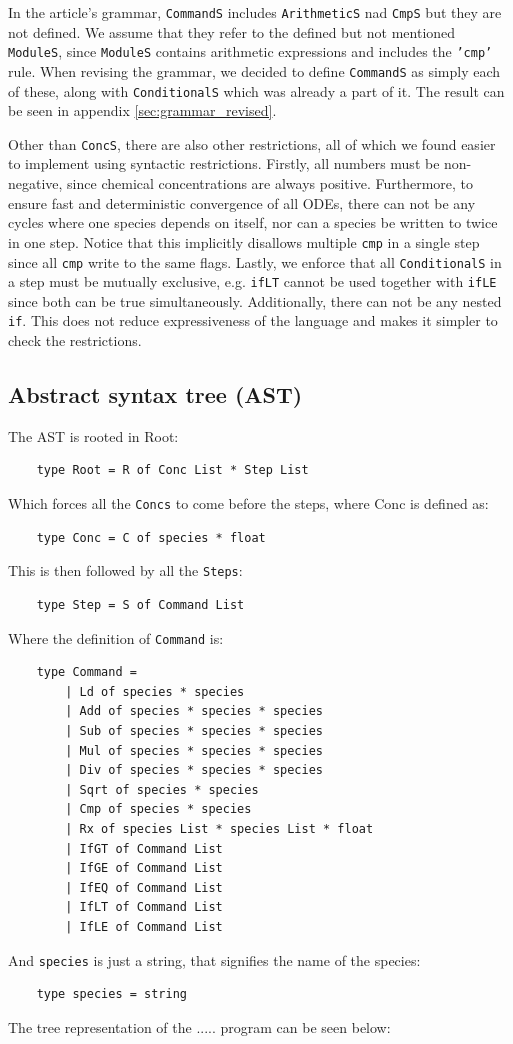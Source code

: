 In the article's grammar, \texttt{CommandS} includes \texttt{ArithmeticS} nad \texttt{CmpS} but they are not defined. We assume that they refer to the defined but not mentioned \texttt{ModuleS}, since \texttt{ModuleS} contains arithmetic expressions and includes the \texttt{'cmp'} rule. When revising the grammar, we decided to define \texttt{CommandS} as simply each of these, along with \texttt{ConditionalS} which was already a part of it. The result can be seen in appendix \ref{sec:grammar_revised}. 

Other than \texttt{ConcS}, there are also other restrictions, all of which we found easier to implement using syntactic restrictions. Firstly, all numbers must be non-negative, since chemical concentrations are always positive. Furthermore, to ensure fast and deterministic convergence of all ODEs, there can not be any cycles where one species depends on itself, nor can a species be written to twice in one step. Notice that this implicitly disallows multiple \texttt{cmp} in a single step since all \texttt{cmp} write to the same flags. Lastly, we enforce that all \texttt{ConditionalS} in a step must be mutually exclusive, e.g. \texttt{ifLT} cannot be used together with \texttt{ifLE} since both can be true simultaneously. Additionally, there can not be any nested \texttt{if}. This does not reduce expressiveness of the language and makes it simpler to check the restrictions.


\subsection{Abstract syntax tree (AST)}

The AST is rooted in Root: 
\begin{verbatim}
    type Root = R of Conc List * Step List
\end{verbatim}
Which forces all the \texttt{Concs} to come before the steps, where Conc is defined as:
\begin{verbatim}
    type Conc = C of species * float
\end{verbatim}
This is then followed by all the \texttt{Steps}:
\begin{verbatim}
    type Step = S of Command List
\end{verbatim}
Where the definition of \texttt{Command} is:
\begin{verbatim}
    type Command =
        | Ld of species * species
        | Add of species * species * species
        | Sub of species * species * species
        | Mul of species * species * species
        | Div of species * species * species
        | Sqrt of species * species
        | Cmp of species * species
        | Rx of species List * species List * float
        | IfGT of Command List
        | IfGE of Command List
        | IfEQ of Command List
        | IfLT of Command List
        | IfLE of Command List
\end{verbatim}
And \texttt{species} is just a string, that signifies the name of the species:
\begin{verbatim}
    type species = string
\end{verbatim}
The tree representation of the ..... program can be seen below:
